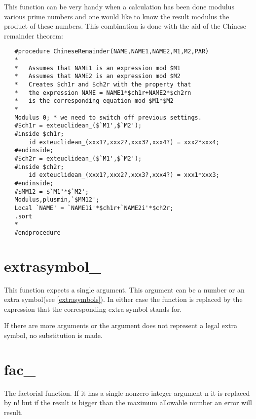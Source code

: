 \noindent This function can be very handy when a calculation has been done 
modulus various prime numbers and one would like to know the result modulus 
the product of these numbers. This combination is done with the aid of the 
Chinese remainder theorem:
\begin{verbatim}
   #procedure ChineseRemainder(NAME,NAME1,NAME2,M1,M2,PAR)
   *
   *   Assumes that NAME1 is an expression mod $M1
   *   Assumes that NAME2 is an expression mod $M2
   *   Creates $ch1r and $ch2r with the property that
   *   the expression NAME = NAME1*$ch1r+NAME2*$ch2rn
   *   is the corresponding equation mod $M1*$M2
   *
   Modulus 0; * we need to switch off previous settings.
   #$ch1r = exteuclidean_($`M1',$`M2');
   #inside $ch1r;
       id exteuclidean_(xxx1?,xxx2?,xxx3?,xxx4?) = xxx2*xxx4;
   #endinside;
   #$ch2r = exteuclidean_($`M1',$`M2');
   #inside $ch2r;
       id exteuclidean_(xxx1?,xxx2?,xxx3?,xxx4?) = xxx1*xxx3;
   #endinside;
   #$MM12 = $`M1'*$`M2';
   Modulus,plusmin,`$MM12';
   Local `NAME' = `NAME1i'*$ch1r+`NAME2i'*$ch2r;
   .sort
   *
   #endprocedure
\end{verbatim}


\section{extrasymbol\_}
\label{funextrasymbol}

\noindent This function expects a single argument. This argument can be a 
number or an extra symbol(see \ref{extrasymbols}). In either case the 
function is replaced by the expression that the corresponding extra symbol 
stands for.

\noindent If there are more arguments or the argument does not represent a 
legal extra symbol, no substitution is made.


\section{fac\_}
\label{funfac}
\noindent The factorial function. If it has a single nonzero 
integer argument n it is replaced by n! but if the result is bigger than 
the maximum allowable number an error will result.

 
